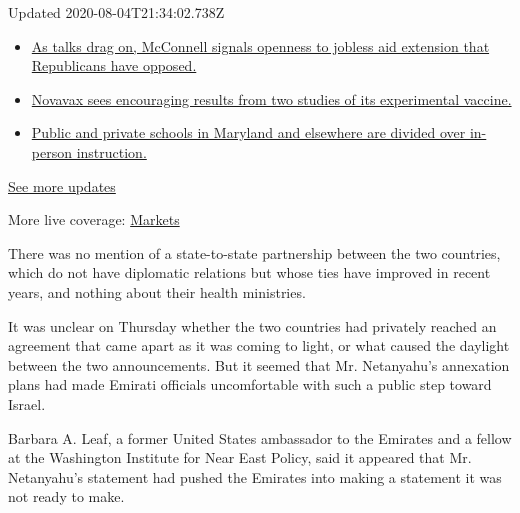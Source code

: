 Updated 2020-08-04T21:34:02.738Z

\begin{itemize}
\tightlist
\item
  \href{https://www.nytimes3xbfgragh.onion/2020/08/04/world/coronavirus-cases.html?action=click\&pgtype=Article\&state=default\&region=MAIN_CONTENT_1\&context=storylines_live_updates\#link-2daa96b5}{As
  talks drag on, McConnell signals openness to jobless aid extension
  that Republicans have opposed.}
\item
  \href{https://www.nytimes3xbfgragh.onion/2020/08/04/world/coronavirus-cases.html?action=click\&pgtype=Article\&state=default\&region=MAIN_CONTENT_1\&context=storylines_live_updates\#link-1228a480}{Novavax
  sees encouraging results from two studies of its experimental
  vaccine.}
\item
  \href{https://www.nytimes3xbfgragh.onion/2020/08/04/world/coronavirus-cases.html?action=click\&pgtype=Article\&state=default\&region=MAIN_CONTENT_1\&context=storylines_live_updates\#link-4825b93}{Public
  and private schools in Maryland and elsewhere are divided over
  in-person instruction.}
\end{itemize}

\href{https://www.nytimes3xbfgragh.onion/2020/08/04/world/coronavirus-cases.html?action=click\&pgtype=Article\&state=default\&region=MAIN_CONTENT_1\&context=storylines_live_updates}{See
more updates}

More live coverage:
\href{https://www.nytimes3xbfgragh.onion/live/2020/08/04/business/stock-market-today-coronavirus?action=click\&pgtype=Article\&state=default\&region=MAIN_CONTENT_1\&context=storylines_live_updates}{Markets}

There was no mention of a state-to-state partnership between the two
countries, which do not have diplomatic relations but whose ties have
improved in recent years, and nothing about their health ministries.

It was unclear on Thursday whether the two countries had privately
reached an agreement that came apart as it was coming to light, or what
caused the daylight between the two announcements. But it seemed that
Mr. Netanyahu's annexation plans had made Emirati officials
uncomfortable with such a public step toward Israel.

Barbara A. Leaf, a former United States ambassador to the Emirates and a
fellow at the Washington Institute for Near East Policy, said it
appeared that Mr. Netanyahu's statement had pushed the Emirates into
making a statement it was not ready to make.

